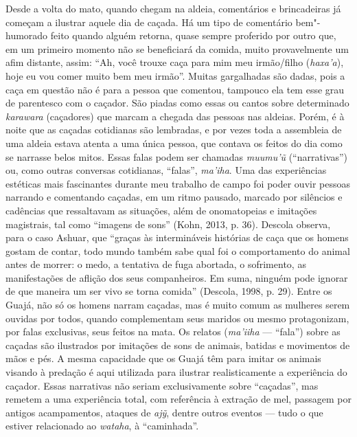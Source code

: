 Desde a volta do mato, quando chegam na aldeia, comentários e
brincadeiras já começam a ilustrar aquele dia de caçada. Há um tipo de
comentário bem"-humorado feito quando alguém retorna, quase sempre
proferido por outro que, em um primeiro momento não se beneficiará da
comida, muito provavelmente um afim distante, assim: ``Ah, você trouxe
caça para mim meu irmão/filho (\emph{haxa'a}), hoje eu vou comer
muito bem meu irmão''. Muitas gargalhadas são dadas, pois a caça em
questão não é para a pessoa que comentou, tampouco ela tem esse grau de
parentesco com o caçador. São piadas como essas ou cantos sobre
determinado \emph{karawara} (caçadores) que marcam a chegada das pessoas
nas aldeias. Porém, é à noite que as caçadas cotidianas são lembradas, e
por vezes toda a assembleia de uma aldeia estava atenta a uma única
pessoa, que contava os feitos do dia como se narrasse belos mitos. Essas
falas podem ser chamadas \emph{muumu'ũ} (``narrativas'') ou, como outras
conversas cotidianas, ``falas'', \emph{ma'iha}. Uma das experiências
estéticas mais fascinantes durante meu trabalho de campo foi poder ouvir
pessoas narrando e comentando caçadas, em um ritmo pausado, marcado por
silêncios e cadências que ressaltavam as situações, além de onomatopeias
e imitações magistrais, tal como ``imagens de sons'' (Kohn, 2013, p. 36).
Descola observa, para o caso Ashuar, que ``graças às intermináveis
histórias de caça que os homens gostam de contar, todo mundo também sabe
qual foi o comportamento do animal antes de morrer: o medo, a tentativa
de fuga abortada, o sofrimento, as manifestações de aflição dos seus
companheiros. Em suma, ninguém pode ignorar de que maneira um ser vivo
se torna comida'' (Descola, 1998, p. 29). Entre os Guajá, não só os
homens narram caçadas, mas é muito comum as mulheres serem ouvidas por
todos, quando complementam seus maridos ou mesmo protagonizam, por falas
exclusivas, seus feitos na mata. Os relatos (\emph{ma'iiha} --- ``fala'')
sobre as caçadas são ilustrados por imitações de sons de animais,
batidas e movimentos de mãos e pés. A mesma capacidade que os Guajá têm
para imitar os animais visando à predação é aqui utilizada para ilustrar
realisticamente a experiência do caçador. Essas narrativas não seriam
exclusivamente sobre ``caçadas'', mas remetem a uma experiência total, com
referência à extração de mel, passagem por antigos acampamentos, ataques
de \emph{ajỹ}, dentre outros eventos --- tudo o que estiver relacionado ao
\emph{wataha}, à ``caminhada''.

